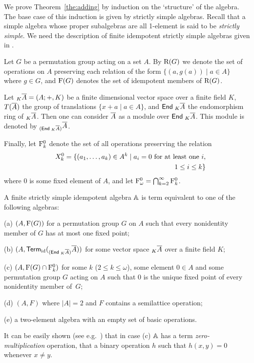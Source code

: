 \documentclass[11pt]{article}
\begin{document}
We prove Theorem~\ref{the:adding} by induction on the `structure' of the algebra.
The base case of this induction is given by strictly simple algebras.
Recall that a simple algebra whose proper subalgebras are all
1-element is said to be {\em strictly simple}. We need the description
of finite idempotent strictly simple algebras given in
\cite{Szendrei90:surjective}. 

Let $G$ be a permutation group acting on a set $A$. By ${\rm R}(G)$ we
denote the set of operations on $A$ preserving each
relation of the form $\{(a,g(a))\mid a\in A\}$ where
$g\in G$, and ${\rm F}(G)$ denotes the set of idempotent
members of ${\rm R}(G)$.

Let ${}_K\overline A=(A;+,K)$ be a finite dimensional
vector space over a finite field $K$, $T(\overline A)$  the group of
translations 
$\{x+a\mid a\in A\}$, and ${\sf End}\;_K\overline A$ the endomorphism ring
of ${}_K\overline A$. Then one can consider $\overline A$ as a module over
${\sf End}\;_K\overline A$. This module is denoted by ${}_{({\sf End}\;_K\overline A)}\overline A$.

Finally, let ${\rm F}^0_k$ denote the set of all
operations preserving the relation
\begin{eqnarray*}
&& X^0_k=\{(a_1,\ldots, a_k)\in A^k\mid a_i=0\hbox{ for at least one
$i$,}\\
&&\qquad 1\le i\le k\}
\end{eqnarray*}
where $0$ is some fixed element of $A$,
and let ${\rm F}^0_\omega=\bigcap_{k=2}^\infty{{\rm F}^0_k}$.
\begin{theorem} \label{str}
A finite strictly simple idempotent algebra ${\mathbb A}$ is 
term equivalent to one of the following algebras:

(a) $(A,{\rm F}(G))$ for a permutation group $G$ on $A$
such that every nonidentity member of $G$ has at most one
fixed point;

(b) $(A,{\sf Term}_{\rm id}({}_{({\sf End}\;_K\overline A)}\overline A))$ for
some vector space ${}_K\overline A$ over a finite field $K$;

(c) $(A,{\rm F}(G)\cap{\rm F}^0_k)$ for some $k$ ($2\le k\le\omega$),
some element $0\in A$ and some permutation group $G$ acting on $A$
such that $0$ is the unique fixed point of every nonidentity
member of~$G$;

(d) $(A,F)$ where $|A|=2$ and $F$ contains a semilattice operation;

(e) a two-element algebra with an empty set of basic operations.
\end{theorem}
It can be easily shown (see e.g.\ \cite{Bulatov05:classifying}) that
in case (c) ${\mathbb A}$ has a term {\em zero-multiplication} operation, that
a binary operation $h$ such that $h(x,y)=0$ whenever $x\ne y$.
\end{document}
